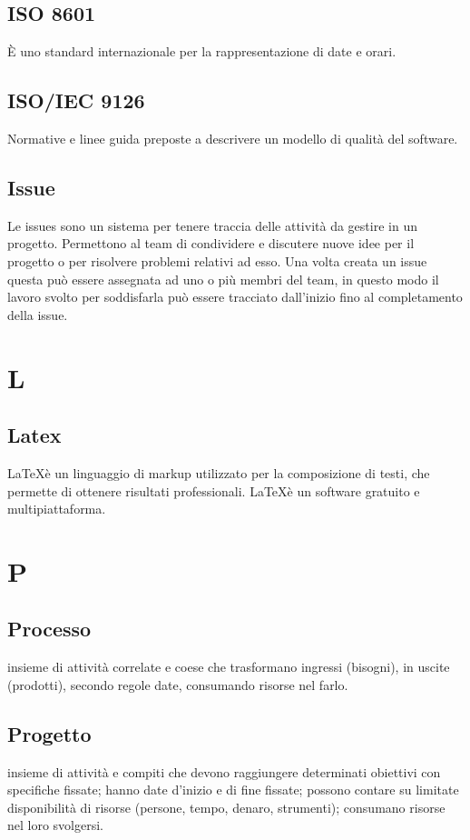 	\subsection{ISO 8601}
	È uno standard internazionale per la rappresentazione di date e orari.
	\subsection{ISO/IEC 9126}
	Normative e linee guida preposte a descrivere un modello di qualità del software.
	\subsection{Issue}
	Le issues sono un sistema per tenere traccia delle attività da gestire in un progetto. Permettono al team di condividere e discutere nuove idee per il progetto o per risolvere problemi relativi ad esso. Una volta creata un issue questa può essere assegnata ad uno o più membri del team, in questo modo il lavoro svolto per soddisfarla può essere tracciato dall'inizio fino al completamento della issue.
	
	
	\section{L}
	
	\subsection{Latex} 
	\LaTeX è un linguaggio di markup utilizzato per la composizione di testi, che permette di ottenere risultati professionali. \LaTeX è un software gratuito e multipiattaforma.


	\section{P}
	
	\subsection{Processo} 
	insieme di attività correlate e coese che trasformano ingressi (bisogni), in uscite (prodotti), secondo regole date, consumando risorse nel farlo.

	\subsection{Progetto} 
	insieme di attività e compiti che devono raggiungere determinati
obiettivi con specifiche fissate; hanno date d’inizio e di fine fissate; possono
contare su limitate disponibilità di risorse (persone, tempo, denaro, strumenti); consumano risorse nel loro svolgersi.
	
